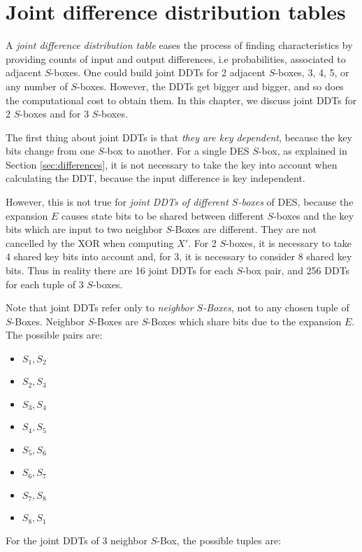 \documentclass{report}
\begin{document}
\section{Joint difference distribution tables}\label{sec:joint-ddt}

A \emph{joint difference distribution table} eases the process of finding characteristics by providing counts of input and output differences, i.e probabilities, associated to adjacent $S$-boxes. One could build joint DDTs for 2 adjacent $S$-boxes, 3, 4, 5, or any number of $S$-boxes. However, the DDTs get bigger and bigger, and so does the computational cost to obtain them. In this chapter, we discuss joint DDTs for 2 $S$-boxes and for 3 $S$-boxes.

The first thing about joint DDTs is that \emph{they are key dependent}, because the key bits change from one $S$-box to another. For a single DES $S$-box, as explained in Section \ref{sec:differences}, it is not necessary to take the key into account when calculating the DDT, because the input difference is key independent.

However, this is not true for \emph{joint DDTs of different $S$-boxes} of DES, because the expansion $E$ causes state bits to be shared between different $S$-boxes and the key bits which are input to two neighbor $S$-Boxes are different. They are not cancelled by the XOR when computing $X'$. For 2 $S$-boxes, it is necessary to take 4 shared key bits into account and, for 3, it is necessary to consider 8 shared key bits. Thus in reality there are 16 joint DDTs for each $S$-box pair, and 256 DDTs for each tuple of 3 $S$-boxes.

Note that joint DDTs refer only to \emph{neighbor $S$-Boxes}, not to any chosen tuple of $S$-Boxes. Neighbor $S$-Boxes are $S$-Boxes which share bits due to the expansion $E$. The possible pairs are: 

\begin{itemize}
    \item $S_1, S_2$
    \item $S_2, S_3$
    \item $S_3, S_4$
    \item $S_4, S_5$
    \item $S_5, S_6$
    \item $S_6, S_7$
    \item $S_7, S_8$
    \item $S_8, S_1$
\end{itemize}

For the joint DDTs of 3 neighbor $S$-Box, the possible tuples are:
\end{document}
